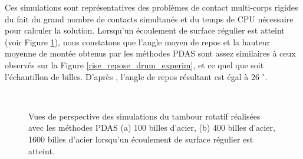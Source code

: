 Ces simulations sont représentatives des problèmes de contact multi-corps rigides du fait du grand nombre de contacts simultanés et du temps de CPU nécessaire pour calculer la solution. Lorsqu'un écoulement de surface régulier est atteint (voir Figure \ref{drum_PDAS}), nous constatons que l'angle moyen de repos et la hauteur moyenne de montée obtenus par les méthodes PDAS sont assez similaires à ceux observés sur la Figure \ref{rise_repose_drum_experim}, et ce quel que soit l'échantillon de billes. D'après \cite{maione2015investigation}, l'angle de repos résultant est égal à 26 $^{\circ}$. \\

\begin{figure}[h!]
\hspace{\fill}
\hspace{\fill}
   \\
\caption{\label{drum}Vues de perspective des simulations du tambour rotatif réalisées avec les méthodes PDAS (a) 100 billes d'acier, (b) 400 billes d'acier, 1600 billes d'acier lorsqu'un écoulement de surface régulier est atteint.}\label{drum_PDAS}
\end{figure}

